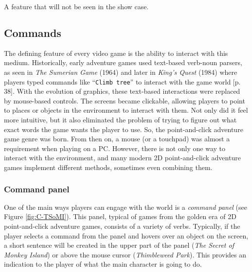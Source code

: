 
\begin{notImplemented}
 \par
\vspace{3mm}
A feature that will not be seen in the show case.
\end{notImplemented}

\subsection{Commands}
\label{sec:Commands}
The defining feature of every video game is the ability to interact with this medium. Historically, early adventure games used text-based verb-noun parsers, as seen in \textit{The Sumerian Game} (1964) and later in \textit{King's Quest} (1984) where players typed commands like “\texttt{Climb tree}” to interact with the game world \cite{Salter2014}[p. 38]. With the evolution of graphics, these text-based interactions were replaced by mouse-based controls. The screens
became clickable, allowing players to point to places or objects in the environment to interact with them.  Not only did it feel more intuitive, but it also eliminated the problem of trying to figure out what exact words the game wants the player to use. So, the point-and-click adventure game genre was born. From then on, a mouse (or a touchpad) was almost a requirement when playing on a PC. However, there is not only one way to interact with the environment, and many modern 2D point-and-click adventure games implement different methods, sometimes even combining them.

\subsubsection{Command panel}
One of the main ways players can engage with the world is a \textit{command panel} (see Figure \ref{fig:C-TSoMI}). This panel, typical of games from the golden era of 2D point-and-click adventure games, consists of a variety of verbs. Typically, if the player selects a command from the panel and hovers over an object on the screen, a short sentence will be created in the upper part of the panel (\textit{The Secret of Monkey Island}) or above the mouse cursor (\textit{Thimbleweed Park}). This provides an indication to the player of what the main character is going to do. 

